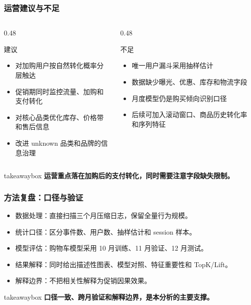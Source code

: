 \documentclass[aspectratio=169]{ctexbeamer}
\newcommand{\keytakeaway}[1]{%
  \vspace{0.10cm}
  \begin{beamercolorbox}[wd=\textwidth,sep=5pt]{takeawaybox}
    \small\textbf{#1}
  \end{beamercolorbox}
}
\begin{document}
\begin{frame}
  \frametitle{运营建议与不足}
  \begin{columns}
    \begin{column}{0.48\textwidth}
      \begin{block}{建议}
      \begin{itemize}
        \item 对加购用户按自然转化概率分层触达
        \item 促销期同时监控流量、加购和支付转化
        \item 对核心品类优化库存、价格带和售后信息
        \item 改进 unknown 品类和品牌的信息治理
      \end{itemize}
      \end{block}
    \end{column}
    \begin{column}{0.48\textwidth}
      \begin{block}{不足}
      \begin{itemize}
        \item 唯一用户漏斗采用抽样估计
        \item 数据缺少曝光、优惠、库存和物流字段
        \item 月度模型仍是购买倾向识别口径
        \item 后续可加入滚动窗口、商品历史转化率和序列特征
      \end{itemize}
      \end{block}
    \end{column}
  \end{columns}
  \keytakeaway{运营重点落在加购后的支付转化，同时需要注意字段缺失限制。}
\end{frame}

\begin{frame}
  \frametitle{方法复盘：口径与验证}
  \begin{itemize}
    \item 数据处理：直接扫描三个月压缩日志，保留全量行为规模。
    \item 统计口径：区分事件数、用户数、抽样估计和 session 样本。
    \item 模型评估：购物车模型采用 10 月训练、11 月验证、12 月测试。
    \item 结果解释：同时给出描述性图表、模型对照、特征重要性和 TopK/Lift。
    \item 解释边界：不把相关性解释为促销因果效果。
  \end{itemize}
  \keytakeaway{口径一致、跨月验证和解释边界，是本分析的主要支撑。}
\end{frame}
\end{document}
